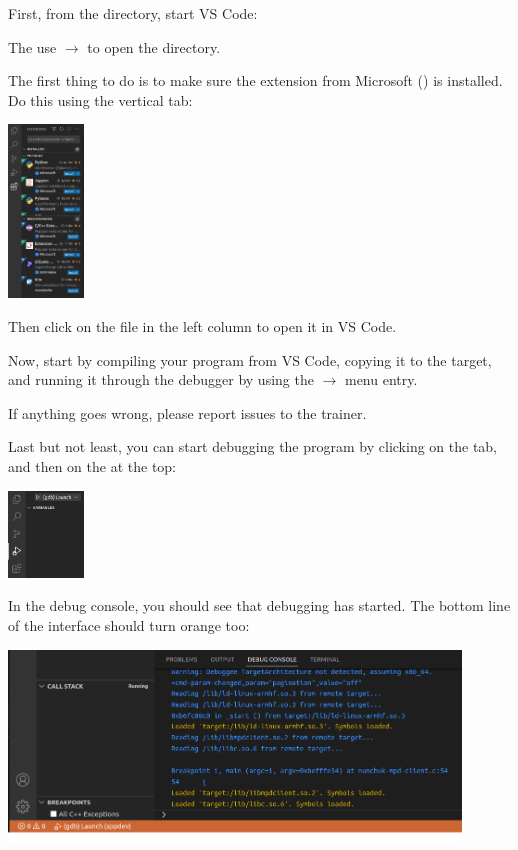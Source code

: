 First, from the  directory, start VS Code:


The use  $\rightarrow$  to open the
 directory.

The first thing to do is to make sure the  extension from Microsoft
() is installed. Do this using the
 vertical tab:

\includegraphics[width=2cm]{labs/sysdev-application-development-and-debugging/vscode-extensions-tab.png}

Then click on the  file in the left
column to open it in VS Code.

Now, start by compiling your program from VS Code, copying it to the
target, and running it through the debugger by using the
 $\rightarrow$  menu entry.

If anything goes wrong, please report issues to the trainer.

Last but not least, you can start debugging the program by clicking on
the  tab, and then on the  at the
top:

\includegraphics[width=2cm]{labs/sysdev-application-development-and-debugging/vscode-run-debug-tab.png}

In the debug console, you should see that debugging has started. The
bottom line of the interface should turn orange too:

\includegraphics[width=12cm]{labs/sysdev-application-development-and-debugging/vscode-debugging-started.png}

